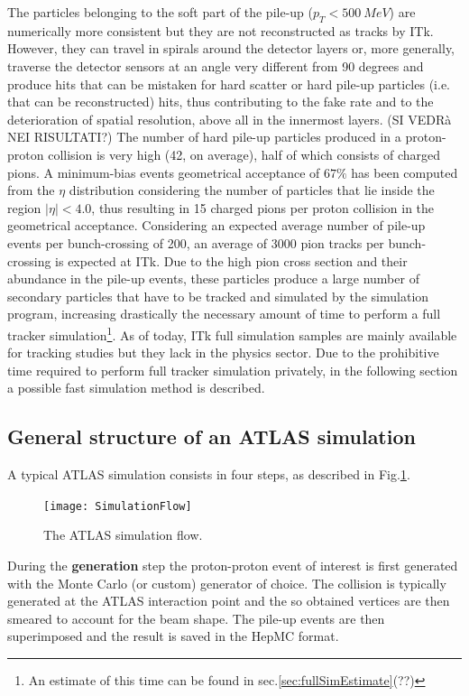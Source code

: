 \documentclass[a4paper,twoside,12pt]{article}
\begin{document}
The particles belonging to the soft part of the pile-up ($p_{T} < 500\ MeV$) are numerically more consistent but 
they are not reconstructed as tracks by ITk. However, they can travel in spirals around the 
detector layers or, more generally, traverse the detector sensors at an angle very different
from 90 degrees and produce hits that can be mistaken for hard scatter or hard pile-up particles
(i.e. that can be reconstructed) hits, thus contributing to the fake rate and to the
deterioration of spatial resolution, above all in the innermost layers. (SI VEDRà NEI RISULTATI?)
The number of hard pile-up particles produced in a proton-proton collision is very high (42, on average), 
half of which consists of charged pions. A minimum-bias events geometrical acceptance of $67\%$ has 
been computed from the $\eta$ distribution considering the number of particles that 
lie inside the region $|\eta| < 4.0$, thus resulting in 15 charged pions per proton collision in 
the geometrical acceptance. Considering an expected average number of pile-up events per bunch-crossing of 200, an average of 3000 pion tracks per bunch-crossing is expected at ITk.
Due to the high pion cross section and their abundance in the pile-up events, these particles produce
a large number of secondary particles that have to be tracked and simulated by the simulation
program, increasing drastically the necessary amount of time to perform a full tracker simulation\footnote{An estimate of this time can be found in sec.\ref{sec:fullSimEstimate}(??)}. As of today, ITk full simulation samples are mainly available for tracking studies but they
lack in the physics sector. Due to the prohibitive time required to perform full tracker 
simulation privately, in the following section a possible fast simulation method is described.

\subsection{General structure of an ATLAS simulation}
A typical ATLAS simulation consists in four steps, as described in Fig.\ref{fig:simulationFlow}.

\begin{figure} [h]
	\texttt{[image: SimulationFlow]}
	\caption{The ATLAS simulation flow. }
	\label{fig:simulationFlow}
\end{figure}

During the \textbf{generation} step the proton-proton event of interest is first generated with the Monte
Carlo (or custom) generator of choice. The collision is typically generated at the ATLAS 
interaction point and the so obtained vertices are then smeared to account for the beam 
shape. The pile-up events are then superimposed and
the result is saved in the HepMC format. \\
\end{document}
